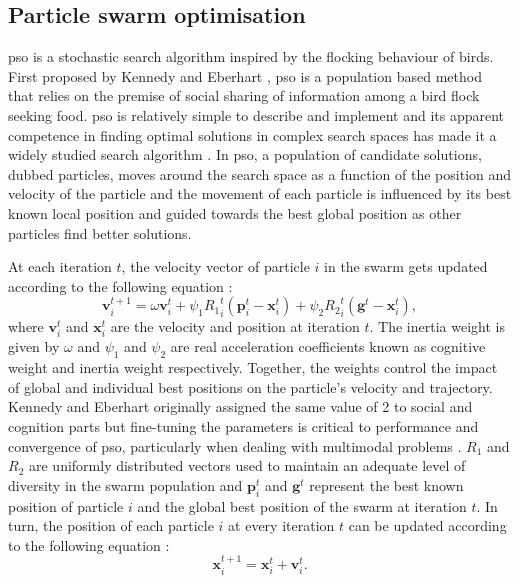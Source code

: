 	
	\subsection{Particle swarm optimisation}
	
	\gls{pso} is a stochastic search algorithm inspired by the flocking behaviour of birds. First proposed by Kennedy and Eberhart \cite{Eberhart:1995aa,Kennedy95}, \gls{pso} is a population based method that relies on the premise of social sharing of information among a bird flock seeking food. \gls{pso} is relatively simple to describe and implement and its apparent competence in finding optimal solutions in complex search spaces has made it a widely studied search algorithm \cite{Freitas:2020aa}. In \gls{pso}, a population of candidate solutions, dubbed particles, moves around the search space as a function of the position and velocity of the particle and the movement of each particle is influenced by its best known local position and guided towards the best global position as other particles find better solutions. 

	At each iteration $t$, the velocity vector of particle $i$ in the swarm gets updated according to the following equation \cite{Bonyadi:2017aa}:
	\begin{equation} \label{eq:PSO_vel}
		\mathbf{v}_i^{t+1} = \omega \mathbf{v}_i^{t} + \psi_1 {R_1}_i^t \left( \mathbf{p}_i^{t} - \mathbf{x}_i^{t} \right) +\psi_2 {R_2}_i^t \left( \mathbf{g}^{t} - \mathbf{x}_i^{t} \right),
	\end{equation}
	where $\mathbf{v}_i^t$ and $\mathbf{x}_i^t$ are the velocity and position at iteration $t$. The inertia weight is given by $\omega$ and $\psi_1$ and $\psi_2$ are real acceleration coefficients known as cognitive weight and inertia weight respectively. Together, the weights control the impact of global and individual best positions on the particle's velocity and trajectory. Kennedy and Eberhart \cite{Kennedy95} originally assigned the same value of \num{2} to social and cognition parts but fine-tuning the parameters is critical to performance and convergence of \gls{pso}, particularly when dealing with multimodal problems \cite{Carlisle:2001aa,Trelea:2003aa,van-den-Bergh:2006aa}. $R_1$ and $R_2$ are uniformly distributed vectors used to maintain an adequate level of diversity in the swarm population and $\mathbf{p}_i^{t}$ and $\mathbf{g}^{t}$ represent the best known position of particle $i$ and the global best position of the swarm at iteration $t$. In turn, the position of each particle $i$ at every iteration $t$ can be updated according to the following equation \cite{Bonyadi:2017aa}:
	\begin{equation}  \label{eq:PSO_pos}
		\mathbf{x}_i^{t+1} = \mathbf{x}_i^{t} + \mathbf{v}_i^{t}.
	\end{equation}
	
